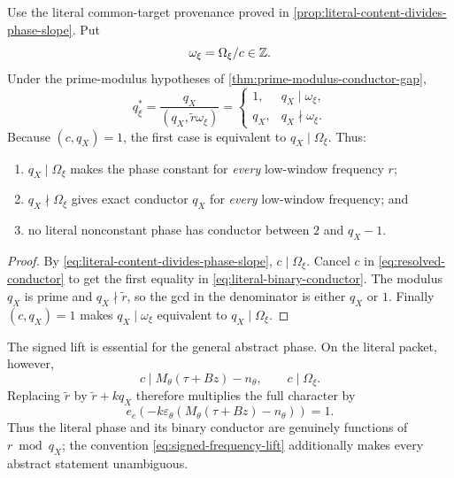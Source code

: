 \begin{theorem}
\label{thm:literal-binary-conductor}
Use the literal common-target provenance proved in
\cref{prop:literal-content-divides-phase-slope}.  Put
\begin{equation}
 \omega_\xi=\Omega_\xi/c\in\mathbb Z.
\label{eq:literal-reduced-phase-slope}
\end{equation}
Under the prime-modulus hypotheses of
\cref{thm:prime-modulus-conductor-gap},
\begin{equation}
 \boxed{
 q_\xi^\ast
 =
 \frac{q_X}{(q_X,\widetilde r\omega_\xi)}
 =
 \begin{cases}
 1,&q_X\mid\omega_\xi,\\
 q_X,&q_X\nmid\omega_\xi.
 \end{cases}}
\label{eq:literal-binary-conductor}
\end{equation}
Because \((c,q_X)=1\), the first case is equivalent to
\(q_X\mid\Omega_\xi\).  Thus:
\begin{enumerate}[label=(\roman*),leftmargin=2.2em]
\item \(q_X\mid\Omega_\xi\) makes the phase constant for
  \emph{every} low-window frequency \(r\);
\item \(q_X\nmid\Omega_\xi\) gives exact conductor \(q_X\) for
  \emph{every} low-window frequency; and
\item no literal nonconstant phase has conductor between \(2\) and
  \(q_X-1\).
\end{enumerate}
\end{theorem}

\begin{proof}
By \eqref{eq:literal-content-divides-phase-slope},
\(c\mid\Omega_\xi\).  Cancel \(c\) in
\eqref{eq:resolved-conductor} to get the first equality in
\eqref{eq:literal-binary-conductor}.  The modulus \(q_X\) is prime
and \(q_X\nmid\widetilde r\), so the gcd in the denominator is either \(q_X\)
or \(1\).  Finally \((c,q_X)=1\) makes
\(q_X\mid\omega_\xi\) equivalent to \(q_X\mid\Omega_\xi\).
\end{proof}

\begin{remark}
\label{rem:literal-representative-invariance}
The signed lift is essential for the general abstract phase.  On the
literal packet, however,
\[
 c\mid M_\theta(\tau+Bz)-n_\theta,
 \qquad c\mid\Omega_\xi.
\]
Replacing \(\widetilde r\) by
\(\widetilde r+kq_X\) therefore multiplies the full character by
\[
 e_c\!\left(
 -k\varepsilon_\theta
 (M_\theta(\tau+Bz)-n_\theta)\right)=1.
\]
Thus the literal phase and its binary conductor are genuinely
functions of \(r\bmod q_X\); the convention
\eqref{eq:signed-frequency-lift} additionally makes every abstract
statement unambiguous.
\end{remark}

